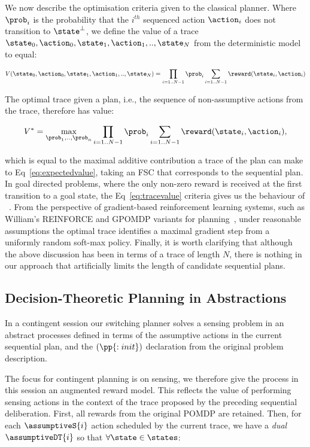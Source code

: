 We now describe the optimisation criteria given to the classical
planner. Where $\prob_i$ is the probability that the $i^{th}$
sequenced action $\action_i$ does not transition to $\state^\bot$, we
define the value of a trace
$\state_0, \action_0, \state_1, \action_1,.., \state_N$ from the
deterministic model to equal:

\begin{equation}\label{eq:tracevalue}
V(\state_0, \action_0, \state_1, \action_1,.., \state_N) =  \prod_{i=1..N-1} \prob_i \sum_{i=1..N-1} \reward(\state_i, \action_i)
\end{equation}

\noindent The optimal trace given a plan, i.e., the sequence of non-assumptive
actions from the trace, therefore has value:

\[
V^* = \max_{\prob_1, .., \prob_n} \prod_{i=1..N-1} \prob_i \sum_{i=1..N-1}
\reward(\state_i, \action_i),
\]

\noindent which is equal to the maximal additive contribution a trace of the plan can
make to Eq~\ref{eq:expectedvalue}, taking an FSC that corresponds to
the sequential plan.  In goal directed problems, where the only
non-zero reward is received at the first transition to a goal state,
the Eq~\ref{eq:tracevalue} criteria gives us the behaviour
of ~\cite{yoon:etal:2007}. From the perspective of
gradient-based reinforcement learning systems, such as William's
REINFORCE and GPOMDP variants for planning~\cite{olivier:doug:2009},
under reasonable assumptions the optimal trace identifies a maximal
gradient step from a uniformly random soft-max policy. Finally, it is
worth clarifying that although the above discussion has been in terms
of a trace of length $N$, there is nothing in our approach that
artificially limits the length of candidate sequential plans.


\subsection{Decision-Theoretic Planning in Abstractions}

In a contingent session our switching planner solves a sensing problem
in an abstract processes defined in terms of the assumptive actions in
the current sequential plan, and the $(\pp{:init})$ declaration from
the original problem description.

The focus for contingent planning is on sensing, we therefore give the
process in this session an augmented reward model.  This reflects the
value of performing sensing actions in the context of the trace
proposed by the preceding sequential deliberation. First, all rewards
from the original POMDP are retained. Then, for each $\assumptiveS{i}$
action scheduled by the current trace, we have a {\em dual}
$\assumptiveDT{i}$ so that $\forall\state\in\states$:


